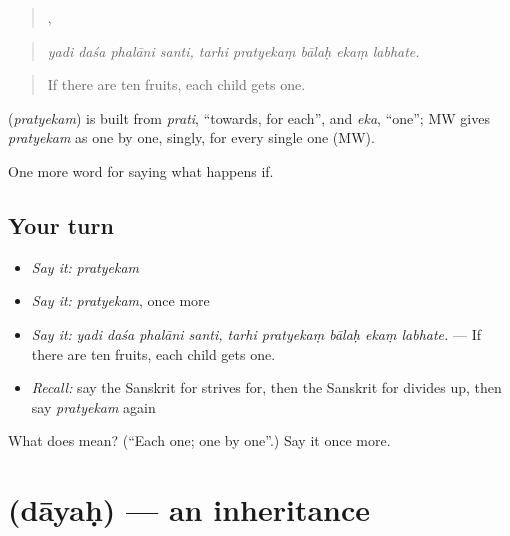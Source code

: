 \begin{quote}
   ,     
\end{quote}

\begin{quote}
\emph{yadi daśa phalāni santi, tarhi pratyekaṃ bālaḥ ekaṃ labhate.}
\end{quote}

\begin{quote}
If there are ten fruits, each child gets one.
\end{quote}

\begin{cousinweb}
\textbf{} (\emph{pratyekam}) is built from \emph{prati}, \textquotedblleft{}towards, for each\textquotedblright{}, and \emph{eka}, \textquotedblleft{}one\textquotedblright{}; MW gives \emph{pratyekam} as one by one, singly, for every single one (MW).
\end{cousinweb}

\begin{grammarlens}[title={What you've built}]
One more word for saying what happens if.
\end{grammarlens}

\subsection*{Your turn}
\begin{itemize}
\raggedright
  \item \emph{Say it:} \emph{pratyekam}
  \item \emph{Say it:} \emph{pratyekam}, once more
  \item \emph{Say it:} \emph{yadi daśa phalāni santi, tarhi pratyekaṃ bālaḥ ekaṃ labhate.} — If there are ten fruits, each child gets one.
  \item \emph{Recall:} say the Sanskrit for strives for, then the Sanskrit for divides up, then say \emph{pratyekam} again
\end{itemize}

\begin{tcolorbox}[breakable,colback=teal!4,colframe=teal!35!black,title={Before you move on}]
What does  mean? (\textquotedblleft{}Each one; one by one\textquotedblright{}.) Say it once more.
\end{tcolorbox}
\section[\texorpdfstring{\sk{दायः} (dāyaḥ)}{दायः (dāyaḥ)}]{ (dāyaḥ) — an inheritance}

